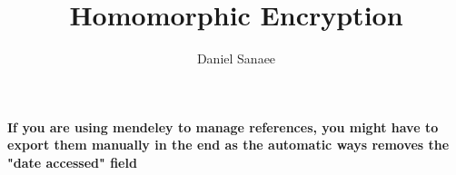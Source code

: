 \documentclass[12pt, openany]{book}
\title{Homomorphic Encryption}
\author{Daniel Sanaee}
\begin{document}












% 

\newpage
{}
%
\textbf{If you are using mendeley to manage references, you might have to export them manually in the end as the automatic ways removes the "date accessed" field}
\printbibliography



\end{document}
